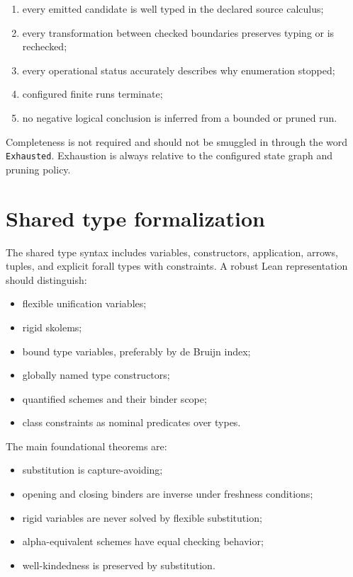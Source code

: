 \documentclass[11pt,letterpaper,openany]{report}
\theoremstyle{definition}
\theoremstyle{remark}
\newcommand{\code}[1]{\texttt{#1}}
\begin{document}
\begin{enumerate}
\item every emitted candidate is well typed in the declared source calculus;
\item every transformation between checked boundaries preserves typing or is rechecked;
\item every operational status accurately describes why enumeration stopped;
\item configured finite runs terminate;
\item no negative logical conclusion is inferred from a bounded or pruned run.
\end{enumerate}

Completeness is not required and should not be smuggled in through the word \code{Exhausted}. Exhaustion is always relative to the configured state graph and pruning policy.

\section{Shared type formalization}

The shared type syntax includes variables, constructors, application, arrows, tuples, and explicit forall types with constraints. A robust Lean representation should distinguish:

\begin{itemize}
\item flexible unification variables;
\item rigid skolems;
\item bound type variables, preferably by de Bruijn index;
\item globally named type constructors;
\item quantified schemes and their binder scope;
\item class constraints as nominal predicates over types.
\end{itemize}

The main foundational theorems are:

\begin{itemize}
\item substitution is capture-avoiding;
\item opening and closing binders are inverse under freshness conditions;
\item rigid variables are never solved by flexible substitution;
\item alpha-equivalent schemes have equal checking behavior;
\item well-kindedness is preserved by substitution.
\end{itemize}
\end{document}
